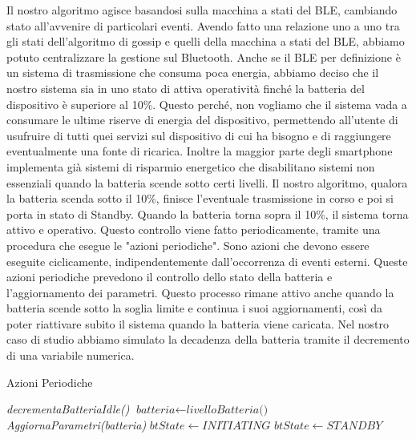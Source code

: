 Il nostro algoritmo agisce basandosi sulla macchina a stati del BLE, cambiando stato all'avvenire di particolari eventi. Avendo fatto una relazione uno a uno tra gli stati dell'algoritmo di gossip e quelli della macchina a stati del BLE, abbiamo potuto centralizzare la gestione sul Bluetooth. Anche se il BLE per definizione è un sistema di trasmissione che consuma poca energia, abbiamo deciso che il nostro sistema sia in uno stato di attiva operatività finché la batteria del dispositivo è superiore al 10\%. Questo perché, non vogliamo che il sistema vada a consumare le ultime riserve di energia del dispositivo, permettendo all'utente di usufruire di tutti quei servizi sul dispositivo di cui ha bisogno e di raggiungere eventualmente una fonte di ricarica. Inoltre la maggior parte degli smartphone implementa già sistemi di risparmio energetico che disabilitano sistemi non essenziali quando la batteria scende sotto certi livelli.
Il nostro algoritmo, qualora la batteria scenda sotto il 10\%, finisce l'eventuale trasmissione in corso e poi si porta in stato di Standby. Quando la batteria torna sopra il 10\%, il sistema torna attivo e operativo. Questo controllo viene fatto periodicamente, tramite una procedura che esegue le "azioni periodiche". Sono azioni che devono essere eseguite ciclicamente, indipendentemente dall'occorrenza di eventi esterni. Queste azioni periodiche prevedono il controllo dello stato della batteria e l'aggiornamento dei parametri. Questo processo rimane attivo anche quando la batteria scende sotto la soglia limite e continua i suoi aggiornamenti, così da poter riattivare subito il sistema quando la batteria viene caricata. Nel nostro caso di studio abbiamo simulato la decadenza della batteria tramite il decremento di una variabile numerica.
\begin{algorithm}[t]
	\caption{Azioni Periodiche}\label{alg:periodic_actions}
	\begin{algorithmic}[1]
		\State \textit{decrementaBatteriaIdle()}
		\State $ \textit{batteria} \gets \textit{livelloBatteria() } $
		\State \textit{AggiornaParametri(\textit{batteria})}
		\State $ \textit{btState} \gets INITIATING $
		\EndIf
		\Else
		\State $ \textit{btState} \gets STANDBY $
		\EndIf
		\EndFunction
	\end{algorithmic}
\end{algorithm}
